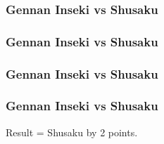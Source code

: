 \begin{frame}

\frametitle{Gennan Inseki vs Shusaku}

\clearintersection{}
\showfullgoban
\end{frame}
\begin{frame}

\frametitle{Gennan Inseki vs Shusaku}

\clearintersection{}
\showfullgoban
\end{frame}
\begin{frame}

\frametitle{Gennan Inseki vs Shusaku}

\clearintersection{}
\showfullgoban
\end{frame}
\begin{frame}

\frametitle{Gennan Inseki vs Shusaku}
Result = Shusaku by 2 points.
\showfullgoban
\end{frame}

